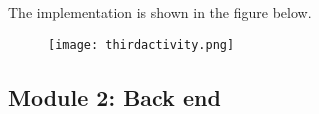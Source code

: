 \documentclass[conference]{IEEEtran}
\begin{document}
\begin{enumerate}
\begin{enumerate}
        The implementation is shown in the figure below.
        
        \begin{figure}[h]
        \begin{center}
        \centering
        \texttt{[image: thirdactivity.png]}
        \caption{}
        \label{fig:my_label}
        \end{center}
        \end{figure}
            
        \end{enumerate}
 



\end{enumerate}

\subsection{Module 2: Back end}
        
       
        
\end{document}
